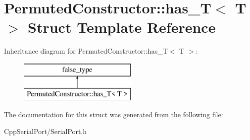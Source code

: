 \hypertarget{struct_permuted_constructor_1_1has___t_3_01_t_01_4}{}\section{Permuted\+Constructor\+:\+:has\+\_\+T$<$ T $>$ Struct Template Reference}
\label{struct_permuted_constructor_1_1has___t_3_01_t_01_4}
Inheritance diagram for Permuted\+Constructor\+:\+:has\+\_\+T$<$ T $>$\+:\begin{figure}[H]
\begin{center}
\leavevmode
\includegraphics[height=2.000000cm]{struct_permuted_constructor_1_1has___t_3_01_t_01_4}
\end{center}
\end{figure}


The documentation for this struct was generated from the following file\+:\begin{DoxyCompactItemize}
\item 
Cpp\+Serial\+Port/Serial\+Port.\+h\end{DoxyCompactItemize}
